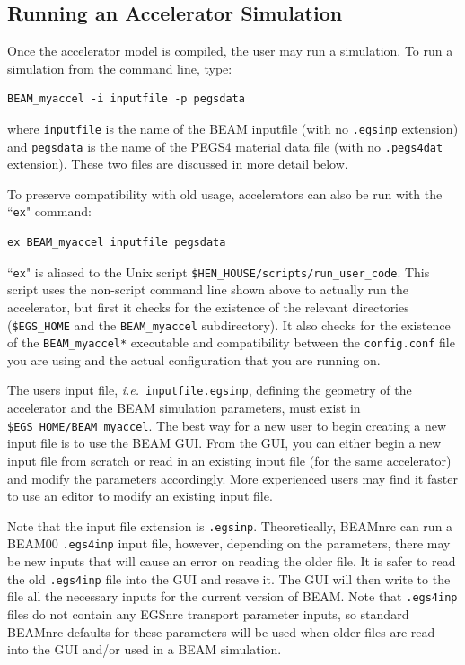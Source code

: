\documentclass[12pt,twoside]{article}
\newcommand{\ie}{{\em i.e.}}
\begin{document}
\subsection{Running an Accelerator Simulation}

Once the accelerator model is compiled, the user may run a simulation.
To run a simulation from the command line, type:
\begin{verbatim}
BEAM_myaccel -i inputfile -p pegsdata
\end{verbatim}
where {\tt inputfile} is the name of the BEAM inputfile (with no
{\tt .egsinp} extension) and {\tt pegsdata} is the name of the PEGS4
material data file (with no {\tt .pegs4dat} extension).  These two
files are discussed in more detail below.

To preserve compatibility with old usage, accelerators can also be run
with the ``{\tt ex}" command:
\begin{verbatim}
ex BEAM_myaccel inputfile pegsdata
\end{verbatim}
``{\tt ex}" is aliased to the Unix script {\tt \$HEN\_HOUSE/scripts/run\_user\_code}.  This script uses the non-script command line shown above to
actually run the accelerator, but first it checks for the existence of
the relevant directories ({\tt \$EGS\_HOME} and the {\tt BEAM\_myaccel}
subdirectory).  It also
checks for the existence of the
{\tt BEAM\_myaccel*} executable and compatibility between the
{\tt config.conf} file you are using and the actual configuration that
you are running on.

The users input file, \ie\ \verb+inputfile.egsinp+, defining the geometry
of the accelerator and the BEAM simulation parameters, must exist
in \verb+$EGS_HOME/BEAM_myaccel+.  The best way for a new user to begin
creating a new input file is to use the BEAM GUI\cite{TR99}.
   From the GUI, you can either begin a new
input file from scratch or read in an existing input file (for the same
accelerator) and modify the parameters accordingly.  More experienced users
may find it faster to use an editor to modify an existing input file.

Note that the input file extension is {\tt .egsinp}.  Theoretically, BEAMnrc
can run a BEAM00 {\tt .egs4inp} input file, however, depending on the
parameters, there may be new inputs that will cause an error on reading
the older file.  It is safer to read the old {\tt .egs4inp} file
into the GUI and resave it.  The GUI will then write to the file all the necessary inputs for
the current version of BEAM.  Note that {\tt .egs4inp} files do not
contain any EGSnrc transport parameter inputs, so standard BEAMnrc
defaults for these parameters will be used when older files are read
into the GUI and/or used in a BEAM simulation.
\end{document}
